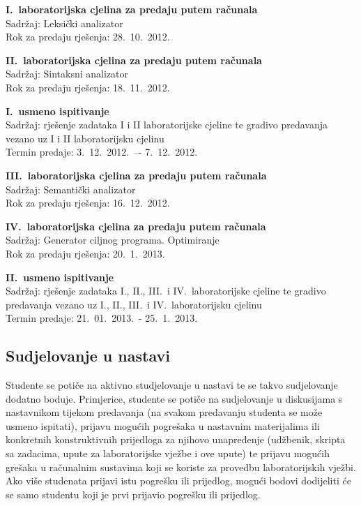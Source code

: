 \documentclass[times, 12pt, utf8]{book}
\begin{document}
\textbf{I.~laboratorijska cjelina za predaju putem računala} \\
Sadržaj: Leksički analizator \\
Rok za predaju rješenja: 28.~10.~2012.

\textbf{II.~laboratorijska cjelina za predaju putem računala} \\
Sadržaj: Sintaksni analizator \\
Rok za predaju rješenja: 18.~11.~2012.

\textbf{I.~usmeno ispitivanje} \\
Sadržaj: rješenje zadataka I i II laboratorijske cjeline te gradivo predavanja vezano uz I i II laboratorijsku cjelinu \\
Termin predaje: 3.~12.~2012.~–- 7.~12.~2012.

\textbf{III.~laboratorijska cjelina za predaju putem računala} \\
Sadržaj: Semantički analizator \\
Rok za predaju rješenja: 16.~12.~2012.

\textbf{IV.~laboratorijska cjelina za predaju putem računala} \\
Sadržaj: Generator ciljnog programa. Optimiranje \\
Rok za predaju rješenja: 20.~1.~2013.

\textbf{II.~usmeno ispitivanje} \\
Sadržaj: rješenje zadataka I., II., III.~i IV.~laboratorijske cjeline te gradivo predavanja vezano uz I., II., III.~i IV.~laboratorijsku cjelinu \\
Termin predaje: 21.~01.~2013.~- 25.~1.~2013.

\cleardoublepage  
{}  
{}
\subsection*{Sudjelovanje u nastavi}

Studente se potiče na aktivno studjelovanje u nastavi te se takvo sudjelovanje dodatno boduje.
Primjerice, studente se potiče na sudjelovanje u diskusijama s nastavnikom tijekom predavanja (na svakom predavanju studenta se može usmeno ispitati), prijavu mogućih pogrešaka u nastavnim materijalima ili konkretnih konstruktivnih prijedloga za njihovo unapređenje (udžbenik, skripta sa zadacima, upute za laboratorijske vježbe i ove upute) te prijavu mogućih grešaka u računalnim sustavima koji se koriste za provedbu laboratorijskih vježbi.
Ako više studenata prijavi istu pogrešku ili prijedlog, mogući bodovi dodijeliti će se samo studentu koji je prvi prijavio pogrešku ili prijedlog.
\end{document}
